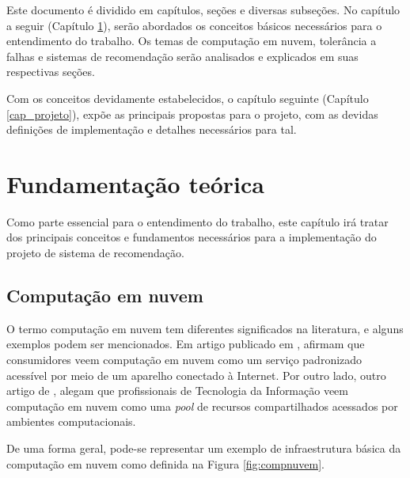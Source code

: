 \documentclass[
	12pt,				%
	a4paper,			%
	english,			%
	french,				%
	spanish,			%
	brazil				%
	]{abntex2}
\begin{document}
Este documento é dividido em capítulos, seções e diversas subseções. No capítulo a seguir (Capítulo \ref{cap_conceitos}), serão abordados os conceitos básicos necessários para o entendimento do trabalho. Os temas de computação em nuvem, tolerância a falhas e sistemas de recomendação serão analisados e explicados em suas respectivas seções.

Com os conceitos devidamente estabelecidos, o capítulo seguinte (Capítulo \ref{cap_projeto}), expõe as principais propostas para o projeto, com as devidas definições de implementação e detalhes necessários para tal.


\chapter{Fundamentação teórica}\label{cap_conceitos}

Como parte essencial para o entendimento do trabalho, este capítulo irá tratar dos principais conceitos e fundamentos necessários para a implementação do projeto de sistema de recomendação.

\section{Computação em nuvem}\label{sec_comp_nuv}

O termo computação em nuvem tem diferentes significados na literatura, e alguns exemplos podem ser mencionados. Em artigo publicado em \citeyear{fernando2013mobile}, \citeauthor{fernando2013mobile} afirmam que consumidores veem computação em nuvem como um serviço padronizado acessível por meio de um aparelho conectado à Internet. Por outro lado, outro artigo de \citeyear{mazhelis2012economic}, \citeauthor{mazhelis2012economic} alegam que profissionais de Tecnologia da Informação veem computação em nuvem como uma \emph{pool} de recursos compartilhados acessados por ambientes computacionais. \cite[p. 1]{khan2018cloud}

De uma forma geral, pode-se representar um exemplo de infraestrutura básica da computação em nuvem como definida na Figura \ref{fig:compnuvem}.
\end{document}
